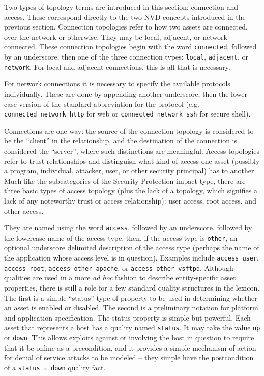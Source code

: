 Two types of topology terms are introduced in this section: connection and access. These
correspond directly to the two NVD concepts introduced in the previous section.
Connection topologies refer to how two assets are connected, over the network or otherwise.
They may be local, adjacent, or network connected. These connection topologies begin with
the word \texttt{connected}, followed by an underscore, then one of the three connection
types: \texttt{local}, \texttt{adjacent}, or \texttt{network}. For local and adjacent
connections, this is all that is necessary. 

For network connections it is
necessary to specify the available protocols individually. These are done by appending another
underscore, then the lower case version of the standard abbreviation for the protocol
(e.g. \texttt{connected\_network\_http} for web or \texttt{connected\_network\_ssh} for
secure shell).

Connections are one-way: the source of the connection topology is considered to be the
``client'' in the relationship, and the destination of the connection is considered
the ``server'', where such distinctions are meaningful.
Access topologies refer to trust relationships and distinguish what kind of access one
asset (possibly a program, individual, attacker, user, or other security principal) has
to another. Much like the subcategories of the Security Protection impact type,
there are three basic types of access topology (plus the lack of a topology, which
signifies a lack of any noteworthy trust or access relationship): user access,
root access, and other access.

They are named using the word \texttt{access}, followed by an underscore, followed
by the lowercase name of the access type, then, if the access type is \texttt{other},
an optional underscore delimited description of the access type (perhaps the name
of the application whose access level is in question). Examples include
\texttt{access\_user}, \texttt{access\_root}, \texttt{access\_other\_apache}, or
\texttt{access\_other\_vsftpd}.
Although qualities are used in a more \emph{ad hoc} fashion to describe entity-specific
asset properties, there is still a role for a few standard quality structures in the
lexicon. The first is a simple ``status'' type of property to be used in determining
whether an asset is enabled or disabled. The second is a preliminary notation for
platform and application specification.
The status property is simple but powerful. Each asset that represents a host has a
quality named \texttt{status}. It may take the value \texttt{up} or \texttt{down}.
This allows exploits against or involving the host in question to require that it
be online as a precondition, and it provides a simple mechanism of action for
denial of service attacks to be modeled -- they simple have the postcondition of
a \texttt{status = down} quality fact.

